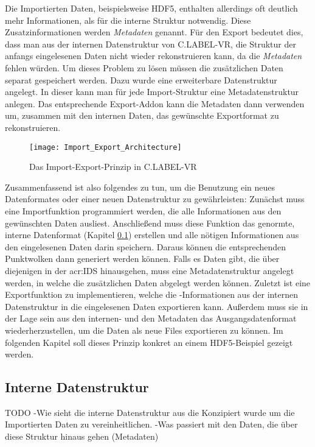 Die Importierten Daten, beispielsweise HDF5, enthalten allerdings oft deutlich mehr Informationen, als für die interne Struktur notwendig. Diese Zusatzinformationen werden \textit{Metadaten} genannt. Für den Export bedeutet dies, dass man aus der internen Datenstruktur von C.LABEL-VR, die Struktur der anfangs eingelesenen Daten nicht wieder rekonstruieren kann, da die \textit{Metadaten} fehlen würden. Um dieses Problem zu lösen müssen die zusätzlichen Daten separat gespeichert werden. Dazu wurde eine erweiterbare Datenstruktur angelegt. In dieser kann man für jede Import-Struktur eine Metadatenstruktur anlegen. Das entsprechende Export-Addon kann die Metadaten dann verwenden um, zusammen mit den internen Daten, das gewünschte Exportformat zu rekonstruieren. \\

\begin{figure}%
	\centering
    \texttt{[image: Import\_Export\_Architecture]}
    \caption{Das Import-Export-Prinzip in C.LABEL-VR}
    \label{fig:ImportExport}
\end{figure}

Zusammenfassend ist also folgendes zu tun, um die Benutzung ein neues Datenformates oder einer neuen Datenstruktur zu gewährleisten: Zunächst muss eine Importfunktion programmiert werden, die alle Informationen aus den gewünschten Daten ausliest. Anschließend muss diese Funktion das genormte, interne Datenformat (Kapitel \ref{sec:IDS}) erstellen und alle nötigen Informationen aus den eingelesenen Daten darin speichern.  Daraus können die entsprechenden Punktwolken dann generiert werden können. Falls es Daten gibt, die über diejenigen in der \acrshort{acr:IDS} hinausgehen, muss eine Metadatenstruktur angelegt werden, in welche die zusätzlichen Daten abgelegt werden können. Zuletzt ist eine Exportfunktion zu implementieren, welche die -Informationen aus der internen Datenstruktur in die eingelesenen Daten exportieren kann. Außerdem muss sie in der Lage sein aus den internen- und den Metadaten das Ausgangsdatenformat wiederherzustellen, um die Daten als neue Files exportieren zu können. Im folgenden Kapitel soll dieses Prinzip konkret an einem HDF5-Beispiel gezeigt werden.

\subsection{Interne Datenstruktur}
\label{sec:IDS}
TODO 
-Wie sieht die interne Datenstruktur aus die Konzipiert wurde um die Importierten Daten zu vereinheitlichen.
-Was passiert mit den Daten, die über diese Struktur hinaus gehen (Metadaten)

